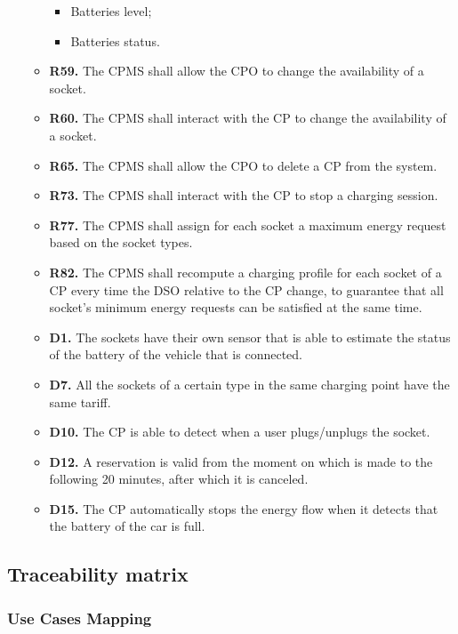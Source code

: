 \documentclass{Configuration_Files/PoliMi3i_thesis}
\begin{document}
\begin{enumerate}[label=\textbf{G\arabic*}]
\begin{itemize}
\begin{itemize}
                    \item Batteries level;
                    \item Batteries status.
                \end{itemize}
            \item \textbf{R59.} The CPMS shall allow the CPO to change the availability of a socket.
            \item \textbf{R60.} The CPMS shall interact with the CP to change the availability of a socket.
            \item \textbf{R65.} The CPMS shall allow the CPO to delete a CP from the system.
            \item \textbf{R73.} The CPMS shall interact with the CP to stop a charging session.
            \item \textbf{R77.} The CPMS shall assign for each socket a maximum energy request based on the socket types.
            \item \textbf{R82.} The CPMS shall recompute a charging profile for each socket of a CP every time the DSO relative to the CP change, to guarantee that all socket's minimum energy requests can be satisfied at the same time.
            \item \textbf{D1.} The sockets have their own sensor that is able to estimate the status of the battery of the vehicle that is connected.
            \item \textbf{D7.} All the sockets of a certain type in the same charging point have the same tariff.
            \item \textbf{D10.} The CP is able to detect when a user plugs/unplugs the socket.
            \item \textbf{D12.} A reservation is valid from the moment on which is made to the following 20 minutes, after which it is canceled.
            \item \textbf{D15.} The CP automatically stops the energy flow when it detects that the battery of the car is full.
        \end{itemize}

\end{enumerate}

\newpage
\subsection{Traceability matrix}

\subsubsection{Use Cases Mapping}
\end{document}

